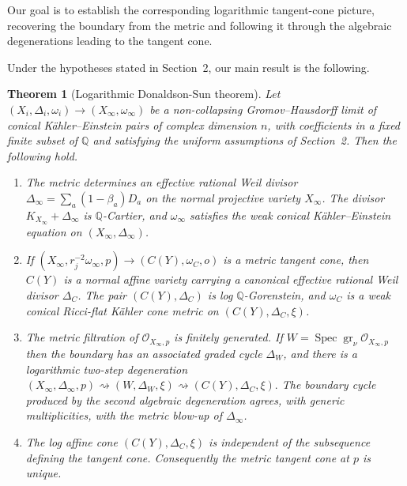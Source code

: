\documentclass[11pt]{amsart}
\newtheorem{theorem}{Theorem}[section]
\theoremstyle{definition}
\theoremstyle{remark}
\begin{document}
Our goal is to establish the corresponding logarithmic tangent-cone picture,
recovering the boundary from the metric and following it through the algebraic
degenerations leading to the tangent cone.

Under the hypotheses stated in Section~2, our main result is the following.

\begin{theorem}[Logarithmic Donaldson-Sun theorem]
\label{thm:main-log-ds}
Let $(X_i,\Delta_i,\omega_i) \longrightarrow (X_\infty,\omega_\infty)$
be a non-collapsing Gromov--Hausdorff limit of conical
K\"ahler--Einstein pairs of complex dimension $n$, with coefficients in a
fixed finite subset of $\mathbb Q$ and satisfying the uniform assumptions of
Section~2. Then the following hold.

\begin{enumerate}
\item The metric determines an effective rational Weil divisor $ \Delta_\infty=\sum_a(1-\beta_a)D_a$ on the normal projective variety $X_\infty$. The divisor
$K_{X_\infty}+\Delta_\infty$ is $\mathbb Q$-Cartier, and
$\omega_\infty$ satisfies the weak conical K\"ahler--Einstein equation on
$(X_\infty,\Delta_\infty)$.

\item If $(X_\infty,r_j^{-2}\omega_\infty,p) \longrightarrow (C(Y),\omega_C,o)$
is a metric tangent cone, then $C(Y)$ is a normal affine variety carrying a
canonical effective rational Weil divisor $\Delta_C$. The pair
$(C(Y),\Delta_C)$ is log $\mathbb Q$-Gorenstein, and $\omega_C$ is a weak
conical Ricci-flat K\"ahler cone metric on
$(C(Y),\Delta_C,\xi)$.

\item The metric filtration of $\mathcal O_{X_\infty,p}$ is finitely
generated. If  $W=\operatorname{Spec}\operatorname{gr}_\nu \mathcal O_{X_\infty,p} $
then the boundary has an associated graded cycle $\Delta_W$, and there is a
logarithmic two-step degeneration
$ (X_\infty,\Delta_\infty,p)
        \rightsquigarrow
        (W,\Delta_W,\xi)
        \rightsquigarrow
        (C(Y),\Delta_C,\xi).
$
The boundary cycle produced by the second algebraic degeneration agrees, with
generic multiplicities, with the metric blow-up of $\Delta_\infty$.

\item The log affine cone $(C(Y),\Delta_C,\xi)$ is independent of the
subsequence defining the tangent cone. Consequently the metric tangent cone at
$p$ is unique.
\end{enumerate}
\end{theorem}
\end{document}
